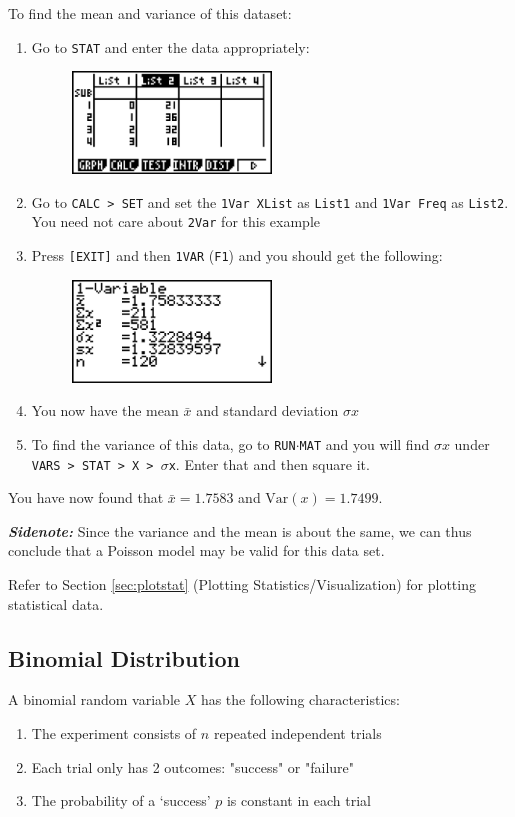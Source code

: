 \documentclass[a5paper]{memoir}
\def\code#1{\texttt{#1}}
\def\sidenote#1{\textcolor[HTML]{00559e}{\textbf{\textit{Sidenote:}}} \textcolor[HTML]{3c90d8}{#1}}
\def\runmat{\code{RUN$\cdot$MAT} }
\def\Fone{(\code{F1}) }
\begin{document}
To find the mean and variance of this dataset:
\begin{enumerate}
	\item Go to \code{STAT} and enter the data appropriately:
	\begin{figure}[h]
		\centering
		\includegraphics[width=0.5\textwidth]{expressway_accident_1}
	\end{figure}
	\item Go to \code{CALC > SET} and set the \code{1Var XList} as \code{List1} and \code{1Var Freq} as \code{List2}. You need not care about \code{2Var} for this example
	\item Press \code{[EXIT]} and then \code{1VAR} \Fone and you should get the following:
	\begin{figure}[h]
		\centering
		\includegraphics[width=0.5\textwidth]{expressway_accident_2}
	\end{figure}
	\item You now have the mean $\bar{x}$ and standard deviation $\sigma x$
	\item To find the variance of this data, go to \runmat and you will find $\sigma x$ under \code{VARS > STAT > X > $\sigma$x}. Enter that and then square it.	
\end{enumerate}

You have now found that $\bar{x} = 1.7583$ and $\text{Var}(x)=1.7499$. 

\sidenote{Since the variance and the mean is about the same, we can thus conclude that a Poisson model may be valid for this data set.}

Refer to Section \ref{sec:plotstat} (Plotting Statistics/Visualization) for plotting statistical data.

\subsection{Binomial Distribution} \label{sec:binom}
A binomial random variable $X$ has the following characteristics:
\begin{enumerate}
	\item The experiment consists of $n$ repeated independent trials
	\item Each trial only has 2 outcomes: "success" or "failure"
	\item The probability of a `success' $p$ is constant in each trial
\end{enumerate}
\end{document}
